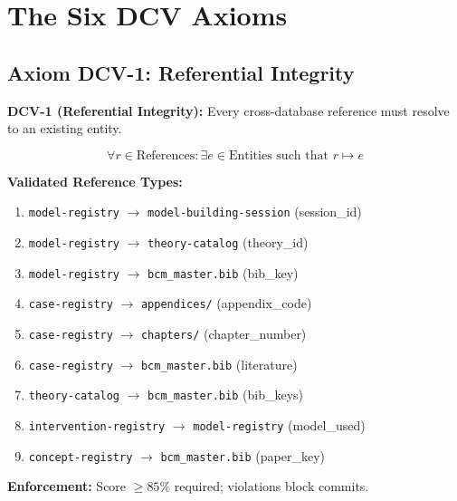 \section{The Six DCV Axioms}
\label{sec:vc-axioms}

\subsection{Axiom DCV-1: Referential Integrity}

\begin{tcolorbox}[colback=blue!5!white, colframe=blue!75!black]
\textbf{DCV-1 (Referential Integrity):} Every cross-database reference must resolve to an existing entity.

\begin{equation}
\forall r \in \text{References}: \exists e \in \text{Entities} \text{ such that } r \mapsto e
\end{equation}
\end{tcolorbox}

\textbf{Validated Reference Types:}

\begin{enumerate}
    \item \texttt{model-registry} $\to$ \texttt{model-building-session} (session\_id)
    \item \texttt{model-registry} $\to$ \texttt{theory-catalog} (theory\_id)
    \item \texttt{model-registry} $\to$ \texttt{bcm\_master.bib} (bib\_key)
    \item \texttt{case-registry} $\to$ \texttt{appendices/} (appendix\_code)
    \item \texttt{case-registry} $\to$ \texttt{chapters/} (chapter\_number)
    \item \texttt{case-registry} $\to$ \texttt{bcm\_master.bib} (literature)
    \item \texttt{theory-catalog} $\to$ \texttt{bcm\_master.bib} (bib\_keys)
    \item \texttt{intervention-registry} $\to$ \texttt{model-registry} (model\_used)
    \item \texttt{concept-registry} $\to$ \texttt{bcm\_master.bib} (paper\_key)
\end{enumerate}

\textbf{Enforcement:} Score $\geq 85\%$ required; violations block commits.

